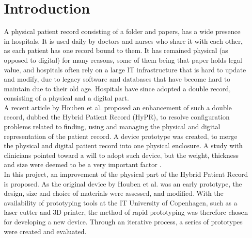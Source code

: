 \section{Introduction}

A physical patient record consisting of a folder and papers, has a wide presence in hospitals. It is used daily by doctors and nurses who share it with each other, as each patient has one record bound to them. It has remained physical (as opposed to digital) for many reasons, some of them being that paper holds legal value, and hospitals often rely on a large IT infrastructure that is hard to update and modify, due to legacy software and databases that have become hard to maintain due to their old age. Hospitals have since adopted a double record, consisting of a physical and a digital part. \\
A recent article by Houben et al. proposed an enhancement of such a double record, dubbed the Hybrid Patient Record (HyPR), to resolve configuration problems related to finding, using and managing the physical and digital representation of the patient record. A device prototype was created, to merge the physical and digital patient record
into one physical enclosure. A study with clinicians pointed toward a will to adopt such device, but the weight, thickness and size were deemed to be a very important factor \cite{hypr}. \\

In this project, an improvement of the physical part of the Hybrid Patient Record is proposed. As the original device by Houben et al. was an early prototype, the design, size and choice of materials were assessed, and modified. With the availability of prototyping tools at the IT University of Copenhagen, such as a laser cutter and 3D printer, the method of rapid prototyping was therefore chosen for developing a new device. Through an iterative process, a series of prototypes were created and evaluated.